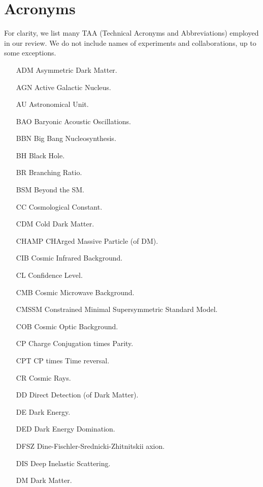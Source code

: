 \def\baselinestretch{0.91}


\chapter{Acronyms}\label{Acronyms}


For clarity, we list many TAA
(Technical Acronyms and Abbreviations)
employed in our review. We do not include names of experiments and collaborations, up to some exceptions.
 

\begin{multicols}{2}
\begin{itemize}
\item[ADM] Asymmetric Dark Matter.
\item[AGN] Active Galactic Nucleus.
\item[AU] Astronomical Unit.
\item[BAO] Baryonic Acoustic Oscillations.
\item[BBN] Big Bang Nucleosynthesis.
\item[BH] Black Hole.
\item[BR] Branching Ratio.
\item[BSM] Beyond the SM.
\item[CC] Cosmological Constant.
\item[CDM] Cold Dark Matter.
\item[CHAMP] CHArged Massive Particle (of DM).
\item[CIB] Cosmic Infrared Background.
\item[CL] Confidence Level.
\item[CMB] Cosmic Microwave Background.
\item[CMSSM] Constrained Minimal Supersymmetric Standard Model.
\item[COB] Cosmic Optic Background.
\item[CP] Charge Conjugation times Parity.
\item[CPT] CP times Time reversal.
\item[CR] Cosmic Rays.
\item[DD] Direct Detection (of Dark Matter).
\item[DE] Dark Energy.
\item[DED] Dark Energy Domination.
\item[DFSZ] Dine-Fischler-Srednicki-Zhitnitskii axion.
\item[DIS] Deep Inelastic Scattering.
\item[DM] Dark Matter.

\end{itemize}
\end{multicols}

